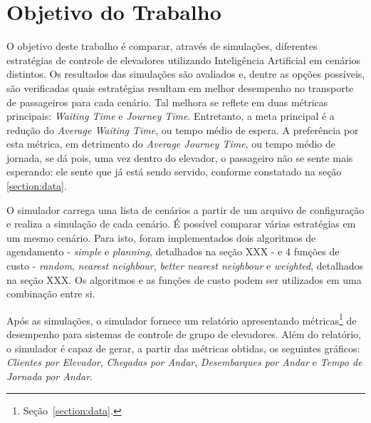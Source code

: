 \chapter{\label{chap:objectives}Objetivo do Trabalho}

O objetivo deste trabalho é comparar, através de simulações, diferentes
estratégias de controle de elevadores utilizando Inteligência Artificial em
cenários distintos. Os resultados das simulações são avaliados e, dentre as
opções possíveis, são verificadas quais estratégias resultam em melhor
desempenho no transporte de passageiros para cada cenário. Tal melhora se
reflete em duas métricas principais: \textit{Waiting Time} e \textit{Journey
Time}. Entretanto, a meta principal é a redução do \textit{Average Waiting
Time}, ou tempo médio de espera. A preferência por esta métrica, em detrimento
do \textit{Average Journey Time}, ou tempo médio de jornada, se dá pois, uma vez
dentro do elevador, o passageiro não se sente mais esperando: ele sente que já
está sendo servido, conforme constatado na seção \ref{section:data}.

O simulador carrega uma lista de cenários a partir de um arquivo de configuração
e realiza a simulação de cada cenário. É possível comparar várias estratégias em
um mesmo cenário. Para isto, foram implementados dois algoritmos de agendamento
- \textit{simple} e \textit{planning}, detalhados na seção XXX - e 4 funções de
custo - \textit{random}, \textit{nearest neighbour}, \textit{better nearest
neighbour} e \textit{weighted}, detalhados na seção XXX. Os algoritmos e as
funções de custo podem ser utilizados em uma combinação entre si.


Após as simulações, o simulador fornece um relatório apresentando
métricas\footnote{Seção~\ref{section:data}.} de desempenho para sistemas de
controle de grupo de elevadores. Além do relatório, o simulador é capaz de
gerar, a partir das métricas obtidas, os seguintes gráficos: \textit{Clientes
por Elevador}, \textit{Chegadas por Andar}, \textit{Desembarques por Andar} e
\textit{Tempo de Jornada por Andar}.


